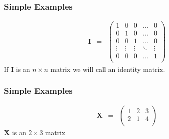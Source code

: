 \documentclass{beamer}
\numberwithin{equation}{section}
\begin{document}
\begin{frame}
\frametitle{Simple Examples} 

\begin{eqnarray} 
\boldsymbol{I} & = & \begin{pmatrix} 
1 & 0 & 0 & \hdots & 0 \\
0 & 1 & 0 & \hdots & 0 \\
0 & 0 & 1 & \hdots & 0 \\
\vdots & \vdots & \vdots & \ddots & \vdots \\
0 & 0 & 0 & \hdots & 1 \\
\end{pmatrix} 
\nonumber 
\end{eqnarray}
If $\boldsymbol{I}$ is an $n \times n$ matrix we will call an \alert{identity} matrix.  

\end{frame}

\begin{frame}
\frametitle{Simple Examples} 

\begin{eqnarray}
\boldsymbol{X} & = & \begin{pmatrix} 
1 & 2 & 3 \\
2 & 1 & 4 \\
\end{pmatrix} 
\nonumber 
\end{eqnarray}
$\boldsymbol{X}$ is an $2 \times 3$ matrix


\end{frame}
\end{document}
